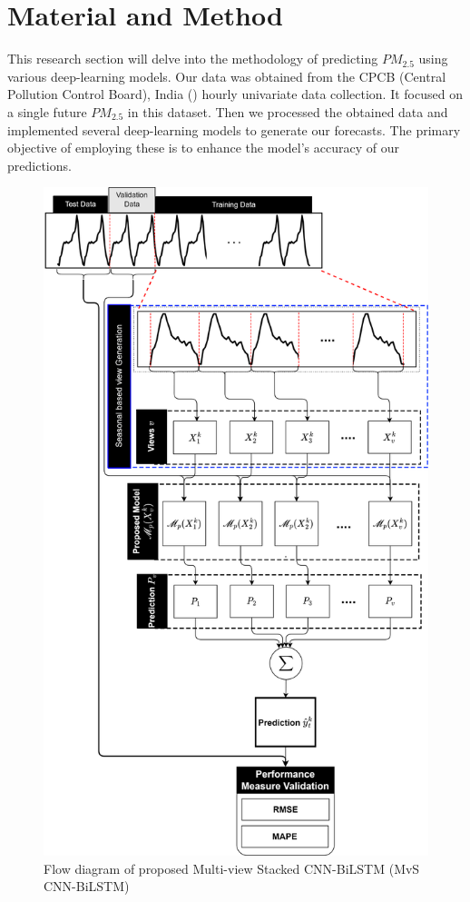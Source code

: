 \documentclass[a4paper, fleqn]{cas-sc}
\theoremstyle{definition}
\theoremstyle{remark}
\begin{document}
\section{Material and Method}
This research section will delve into the methodology of predicting $PM_{2.5}$ using various deep-learning models. Our data was obtained from the  CPCB (Central Pollution Control Board), India (\cite{bhawan2020central}) hourly univariate data collection. It focused on a single future $PM_{2.5}$ in this dataset. Then we processed the obtained data and implemented several deep-learning models to generate our forecasts. The primary objective of employing these is to enhance the model's accuracy of our predictions. 
\begin{figure}[h!]
	\centering
		\includegraphics[scale=0.6]{MvS CNN-BiLSTM}
	  \caption{Flow diagram of proposed Multi-view Stacked CNN-BiLSTM (MvS CNN-BiLSTM)}\label{Muticbilstm}
\end{figure}
\end{document}
